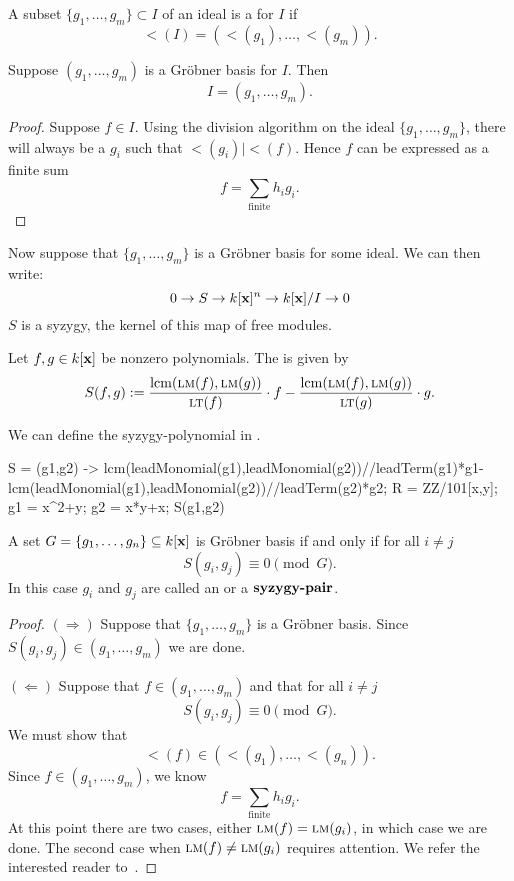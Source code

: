 \documentclass{ximera}
\begin{document}
\begin{definition}
  A subset $\{g_1,\dots, g_m\}\subset I$ of an ideal is a
   for $I$ if
  \[
  \lt(I) = (\lt(g_1),\dots, \lt(g_m)).
  \]
\end{definition}

\begin{proposition}
  Suppose $(g_1,\dots,g_m)$ is a Gr\"obner basis for $I$. Then
  \[
  I = (g_1,\dots,g_m).
  \]
  \begin{proof}
    Suppose $f\in I$. Using the division algorithm on the ideal
    $\{g_1,\dots,g_m\}$, there will always be a $g_i$ such that
    $\lt(g_i)|\lt(f)$. Hence $f$ can be expressed as a finite sum
    \[
    f = \sum_\mathrm{finite} h_i g_i.
    \]
  \end{proof}
\end{proposition}

Now suppose that $\{g_1,\dots,g_m\}$ is a Gr\"obner basis for some
ideal. We can then write:
\[
0 \to S \to k[\mathbf{x}]^n \to k[\mathbf{x}]/I \to 0
\]
$S$ is a syzygy, the kernel of this map of free modules.

\begin{definition}
  Let $f,g\in k[\mathbf{x}]$ be nonzero polynomials. The
   is given by
  \[
  S(f,g) := \frac{\operatorname{lcm}(\textsc{lm}(f),\textsc{lm}(g))}{\textsc{lt}(f)}\cdot f - \frac{\operatorname{lcm}(\textsc{lm}(f),\textsc{lm}(g))}{\textsc{lt}(g)}\cdot g.
  \]
\end{definition}
We can define the syzygy-polynomial in \macaulay.
\begin{macaulay2}
S = (g1,g2) ->
lcm(leadMonomial(g1),leadMonomial(g2))//leadTerm(g1)*g1-
lcm(leadMonomial(g1),leadMonomial(g2))//leadTerm(g2)*g2;
R = ZZ/101[x,y];
g1 = x^2+y;
g2 = x*y+x;
S(g1,g2)
\end{macaulay2}






\begin{theorem}
  A set $G=\{g_1,\dots,g_n\}\subseteq k[\mathbf{x}]$ is Gr\"obner basis if and
  only if for all $i\ne j$ 
  \[
  S(g_i,g_j) \equiv 0 \pmod{G}.
  \]
  In this case $g_i$ and $g_j$ are called an  or a
  $\dfn{syzygy-pair}$.
  \begin{proof}
    $(\Rightarrow)$ Suppose that $\{g_1,\dots,g_m\}$ is a Gr\"obner
    basis. Since $S(g_i,g_j)\in (g_1,\dots,g_m)$ we are done.

    $(\Leftarrow)$ Suppose that $f\in (g_1,\dots,g_m)$ and that for
    all $i\ne j$
    \[
    S(g_i,g_j) \equiv 0 \pmod{G}.
    \]
    We must show that
    \[
    \lt(f) \in (\lt(g_1),\dots, \lt(g_n)).
    \]
    Since $f\in (g_1,\dots,g_m)$, we know
    \[
    f = \sum_{\mathrm{finite}} h_i g_i.
    \]
    At this point there are two cases, either $\textsc{lm}(f) = \textsc{lm}(g_i)$, in
    which case we are done. The second case when $\textsc{lm}(f) \ne \textsc{lm}(g_i)$
    requires attention. We refer the interested reader
    to~\cite{CLO2007}.
  \end{proof}
\end{theorem}
\end{document}
